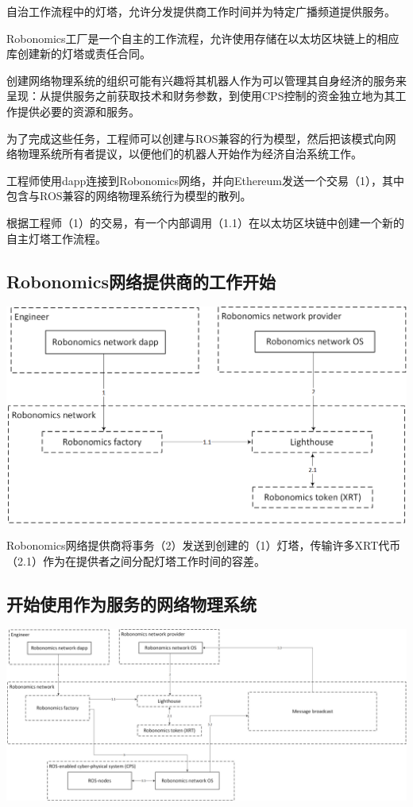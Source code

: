 \documentclass[UTF8]{article}
\begin{document}
自治工作流程中的灯塔，允许分发提供商工作时间并为特定广播频道提供服务。

Robonomics工厂是一个自主的工作流程，允许使用存储在以太坊区块链上的相应库创建新的灯塔或责任合同。

创建网络物理系统的组织可能有兴趣将其机器人作为可以管理其自身经济的服务来呈现：从提供服务之前获取技术和财务参数，到使用CPS控制的资金独立地为其工作提供必要的资源和服务。

为了完成这些任务，工程师可以创建与ROS兼容的行为模型，然后把该模式向网络物理系统所有者提议，以便他们的机器人开始作为经济自治系统工作。

工程师使用dapp连接到Robonomics网络，并向Ethereum发送一个交易（1），其中包含与ROS兼容的网络物理系统行为模型的散列。

根据工程师（1）的交易，有一个内部调用（1.1）在以太坊区块链中创建一个新的自主灯塔工作流程。

\subsection{Robonomics网络提供商的工作开始}

\includegraphics[width=1\textwidth]{step-by-step-2.png}

Robonomics网络提供商将事务（2）发送到创建的（1）灯塔，传输许多XRT代币（2.1）作为在提供者之间分配灯塔工作时间的容差。

\subsection{开始使用作为服务的网络物理系统}

\includegraphics[width=1\textwidth]{step-by-step-3.png}
\end{document}
